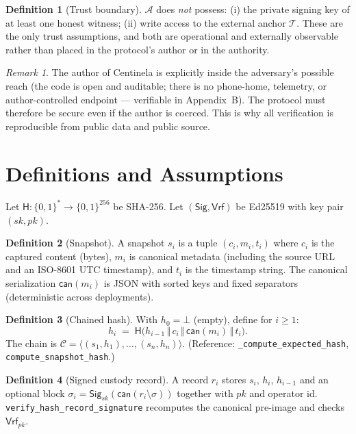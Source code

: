 \documentclass[11pt,a4paper]{article}
\theoremstyle{plain}
\theoremstyle{definition}
\newtheorem{definition}{Definition}
\theoremstyle{remark}
\newtheorem{remark}{Remark}
\newcommand{\Adv}{\mathcal{A}}
\newcommand{\Hash}{\mathsf{H}}
\newcommand{\Sign}{\mathsf{Sig}}
\newcommand{\Verify}{\mathsf{Vrf}}
\newcommand{\concat}{\,\Vert\,}
\newcommand{\code}[1]{\texttt{#1}}
\begin{document}
\begin{definition}[Trust boundary]
$\Adv$ does \emph{not} possess: (i) the private signing key of at least
one honest witness; (ii) write access to the external anchor
$\mathcal{T}$. These are the only trust assumptions, and both are
operational and externally observable rather than placed in the
protocol's author or in the authority.
\end{definition}

\begin{remark}
The author of Centinela is explicitly inside the adversary's possible
reach (the code is open and auditable; there is no phone-home, telemetry,
or author-controlled endpoint --- verifiable in Appendix~B). The protocol
must therefore be secure even if the author is coerced. This is why all
verification is reproducible from public data and public source.
\end{remark}

\section{Definitions and Assumptions}
\label{sec:defs}

Let $\Hash:\{0,1\}^{*}\to\{0,1\}^{256}$ be SHA-256. Let
$(\Sign,\Verify)$ be Ed25519 with key pair $(sk,pk)$.

\begin{definition}[Snapshot]
A snapshot $s_i$ is a tuple $(c_i, m_i, t_i)$ where $c_i$ is the captured
content (bytes), $m_i$ is canonical metadata (including the source URL
and an ISO-8601 UTC timestamp), and $t_i$ is the timestamp string. The
canonical serialization $\mathsf{can}(m_i)$ is JSON with sorted keys and
fixed separators (deterministic across deployments).
\end{definition}

\begin{definition}[Chained hash]
\label{def:chain}
With $h_0 = \bot$ (empty), define for $i \ge 1$:
\[
  h_i \;=\; \Hash\big(h_{i-1} \concat c_i \concat \mathsf{can}(m_i)
  \concat t_i\big).
\]
The chain is $\mathcal{C} = \langle (s_1,h_1),\dots,(s_n,h_n)\rangle$.
(Reference: \code{\_compute\_expected\_hash}, \code{compute\_snapshot\_hash}.)
\end{definition}

\begin{definition}[Signed custody record]
A record $r_i$ stores $s_i$, $h_i$, $h_{i-1}$ and an optional block
$\sigma_i = \Sign_{sk}(\mathsf{can}(r_i \setminus \sigma))$ together with
$pk$ and operator id. \code{verify\_hash\_record\_signature} recomputes
the canonical pre-image and checks $\Verify_{pk}$.
\end{definition}
\end{document}
